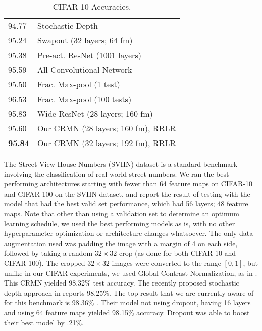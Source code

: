 \documentclass{article}
\begin{document}
\begin{table}[!htb]
\begin{minipage}{.5\linewidth}
\begin{tabular}{ |p{.5cm} p{5.5cm}|}
94.77 & Stochastic Depth \cite{huang2016deep} \\
95.24 & Swapout \cite{singhHF2016swapout} (32 layers; 64 fm) \\ \hline
95.38 & Pre-act. ResNet \cite{he2016identity} (1001 layers) \\
95.59 & All Convolutional Network \cite{springenberg2014striving}  \\ \hline
95.50 & Frac. Max-pool \cite{graham2014fractional} (1 test) \\
96.53 & Frac. Max-pool  \cite{graham2014fractional} (100 tests) \\ \hline
95.83 & Wide ResNet
\cite{zagoruyko2016wide} (28 layers; 160 fm) \\ \hline \hline
     95.60 & Our CRMN (28 layers; 160 fm), RRLR  \\
     \textbf{95.84} & Our CRMN (32 layers; 192 fm), RRLR  \\ \hline
    \end{tabular}
\caption{CIFAR-10 Accuracies.}
\label{tab:cifar10}
 \end{minipage}%
\end{table}

The Street View House Numbers\cite{netzer2011reading} (SVHN) dataset is a standard benchmark involving the classification of real-world street numbers.  We ran the best performing architectures starting with fewer than 64 feature maps on CIFAR-10 and CIFAR-100 on the SVHN dataset, and report the result of testing with the model that had the best valid set performance, which had 56 layers; 48 feature maps. Note that other than using a validation set to determine an optimum learning schedule, we used the best performing models as is, with no other hyperparameter optimization or architecture changes whatsoever.
The only data augmentation used was padding the image with a margin of 4 on each side, followed by taking a random \(32\times32\) crop (as done for both CIFAR-10 and CIFAR-100). The cropped \(32\times32\) images were converted to the range \([0, 1]\), but unlike in our CIFAR experiments, we used Global Contrast Normalization, as in \cite{goodfellow2013multi}. This CRMN yielded 98.32\% test accuracy.
The recently proposed stochastic depth approach in \cite{huang2016deep} reports %
98.25\%.
The top result that we are currently aware of for this benchmark is 98.36\% \cite{zagoruyko2016wide}. Their model not using dropout, having 16 layers and using 64 feature maps yielded 98.15\% accuracy. Dropout was able to boost their best model by .21\%.
\end{document}
